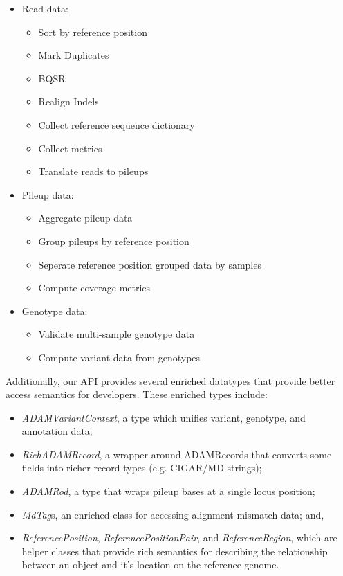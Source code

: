 \documentclass{bioinfo}
\begin{document}
\begin{itemize}
\item Read data:
\begin{itemize}
\item Sort by reference position
\item Mark Duplicates
\item BQSR
\item Realign Indels
\item Collect reference sequence dictionary
\item Collect metrics
\item Translate reads to pileups
\end{itemize}
\item Pileup data:
\begin{itemize}
\item Aggregate pileup data
\item Group pileups by reference position
\item Seperate reference position grouped data by samples
\item Compute coverage metrics
\end{itemize}
\item Genotype data:
\begin{itemize}
\item Validate multi-sample genotype data
\item Compute variant data from genotypes
\end{itemize}
\end{itemize}

Additionally, our API provides several enriched datatypes that provide better access semantics for developers. These enriched types include:

\begin{itemize}
\item \textit{ADAMVariantContext}, a type which unifies variant, genotype, and annotation data;
\item \textit{RichADAMRecord}, a wrapper around ADAMRecords that converts some fields into richer record types (e.g. CIGAR/MD strings);
\item \textit{ADAMRod}, a type that wraps pileup bases at a single locus position;
\item \textit{MdTag}s, an enriched class for accessing alignment mismatch data; and,
\item \textit{ReferencePosition}, \textit{ReferencePositionPair}, and \textit{ReferenceRegion}, which are helper classes that provide rich semantics for describing the relationship
between an object and it's location on the reference genome.
\end{itemize}
\end{document}
